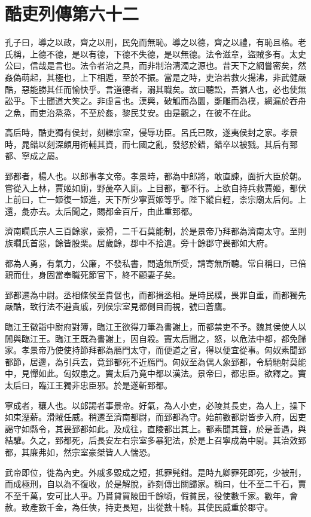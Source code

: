 \chapter{酷吏列傳第六十二}

孔子曰，導之以政，齊之以刑，民免而無恥。導之以德，齊之以禮，有恥且格。老氏稱，上德不德，是以有德，下德不失德，是以無德。法令滋章，盜賊多有。太史公曰，信哉是言也。法令者治之具，而非制治清濁之源也。昔天下之網嘗密矣，然姦偽萌起，其極也，上下相遁，至於不振。當是之時，吏治若救火揚沸，非武健嚴酷，惡能勝其任而愉快乎。言道德者，溺其職矣。故曰聽訟，吾猶人也，必也使無訟乎。下士聞道大笑之。非虛言也。漢興，破觚而為圜，斲雕而為樸，網漏於吞舟之魚，而吏治烝烝，不至於姦，黎民艾安。由是觀之，在彼不在此。

高后時，酷吏獨有侯封，刻轢宗室，侵辱功臣。呂氏已敗，遂夷侯封之家。孝景時，晁錯以刻深頗用術輔其資，而七國之亂，發怒於錯，錯卒以被戮。其后有郅都、寧成之屬。

郅都者，楊人也。以郎事孝文帝。孝景時，都為中郎將，敢直諫，面折大臣於朝。嘗從入上林，賈姬如廁，野彘卒入廁。上目都，都不行。上欲自持兵救賈姬，都伏上前曰，亡一姬復一姬進，天下所少寧賈姬等乎。陛下縱自輕，柰宗廟太后何。上還，彘亦去。太后聞之，賜都金百斤，由此重郅都。

濟南瞯氏宗人三百餘家，豪猾，二千石莫能制，於是景帝乃拜都為濟南太守。至則族瞯氏首惡，餘皆股栗。居歲餘，郡中不拾遺。旁十餘郡守畏都如大府。

都為人勇，有氣力，公廉，不發私書，問遺無所受，請寄無所聽。常自稱曰，已倍親而仕，身固當奉職死節官下，終不顧妻子矣。

郅都遷為中尉。丞相條侯至貴倨也，而都揖丞相。是時民樸，畏罪自重，而都獨先嚴酷，致行法不避貴戚，列侯宗室見都側目而視，號曰蒼鷹。

臨江王徵詣中尉府對簿，臨江王欲得刀筆為書謝上，而都禁吏不予。魏其侯使人以閒與臨江王。臨江王既為書謝上，因自殺。竇太后聞之，怒，以危法中都，都免歸家。孝景帝乃使使持節拜都為鴈門太守，而便道之官，得以便宜從事。匈奴素聞郅都節，居邊，為引兵去，竟郅都死不近鴈門。匈奴至為偶人象郅都，令騎馳射莫能中，見憚如此。匈奴患之。竇太后乃竟中都以漢法。景帝曰，都忠臣。欲釋之。竇太后曰，臨江王獨非忠臣邪。於是遂斬郅都。

寧成者，穰人也。以郎謁者事景帝。好氣，為人小吏，必陵其長吏，為人上，操下如束溼薪。滑賊任威。稍遷至濟南都尉，而郅都為守。始前數都尉皆步入府，因吏謁守如縣令，其畏郅都如此。及成往，直陵都出其上。都素聞其聲，於是善遇，與結驩。久之，郅都死，后長安左右宗室多暴犯法，於是上召寧成為中尉。其治效郅都，其廉弗如，然宗室豪桀皆人人惴恐。

武帝即位，徙為內史。外戚多毀成之短，抵罪髡鉗。是時九卿罪死即死，少被刑，而成極刑，自以為不復收，於是解脫，詐刻傳出關歸家。稱曰，仕不至二千石，賈不至千萬，安可比人乎。乃貰貸買陂田千餘頃，假貧民，役使數千家。數年，會赦。致產數千金，為任俠，持吏長短，出從數十騎。其使民威重於郡守。

